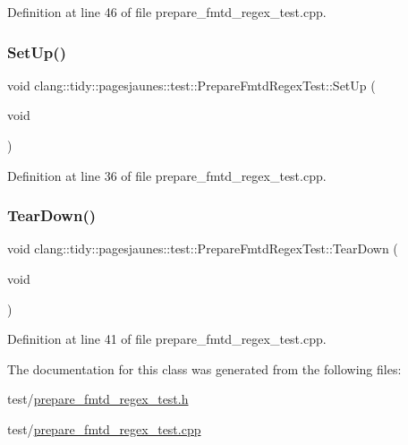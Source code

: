 Definition at line 46 of file prepare\+\_\+fmtd\+\_\+regex\+\_\+test.\+cpp.

\mbox{\label{classclang_1_1tidy_1_1pagesjaunes_1_1test_1_1_prepare_fmtd_regex_test_abe1dd9af56b065c48db4ca30ef07e087}} 
\subsubsection{\texorpdfstring{Set\+Up()}{SetUp()}}
{\footnotesize\ttfamily void clang\+::tidy\+::pagesjaunes\+::test\+::\+Prepare\+Fmtd\+Regex\+Test\+::\+Set\+Up (\begin{DoxyParamCaption}\item[{void}]{ }\end{DoxyParamCaption})\hspace{0.3cm}{\ttfamily [virtual]}}



Definition at line 36 of file prepare\+\_\+fmtd\+\_\+regex\+\_\+test.\+cpp.

\mbox{\label{classclang_1_1tidy_1_1pagesjaunes_1_1test_1_1_prepare_fmtd_regex_test_a78d879351536fdfdcbbf42cf3f9b6094}} 
\subsubsection{\texorpdfstring{Tear\+Down()}{TearDown()}}
{\footnotesize\ttfamily void clang\+::tidy\+::pagesjaunes\+::test\+::\+Prepare\+Fmtd\+Regex\+Test\+::\+Tear\+Down (\begin{DoxyParamCaption}\item[{void}]{ }\end{DoxyParamCaption})\hspace{0.3cm}{\ttfamily [virtual]}}



Definition at line 41 of file prepare\+\_\+fmtd\+\_\+regex\+\_\+test.\+cpp.



The documentation for this class was generated from the following files\+:\begin{DoxyCompactItemize}
\item 
test/\hyperlink{prepare__fmtd__regex__test_8h}{prepare\+\_\+fmtd\+\_\+regex\+\_\+test.\+h}\item 
test/\hyperlink{prepare__fmtd__regex__test_8cpp}{prepare\+\_\+fmtd\+\_\+regex\+\_\+test.\+cpp}\end{DoxyCompactItemize}
